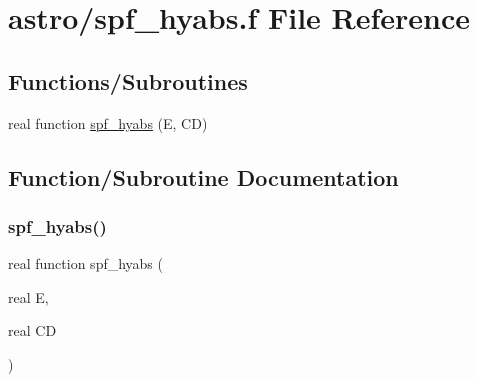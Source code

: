 \hypertarget{spf__hyabs_8f}{}\section{astro/spf\+\_\+hyabs.f File Reference}
\label{spf__hyabs_8f}
\subsection*{Functions/\+Subroutines}
\begin{DoxyCompactItemize}
\item 
real function \hyperlink{spf__hyabs_8f_a7057836dbbbb99e948e1d34a7072e89c}{spf\+\_\+hyabs} (E, CD)
\end{DoxyCompactItemize}


\subsection{Function/\+Subroutine Documentation}
\mbox{\label{spf__hyabs_8f_a7057836dbbbb99e948e1d34a7072e89c}} 
\subsubsection{\texorpdfstring{spf\+\_\+hyabs()}{spf\_hyabs()}}
{\footnotesize\ttfamily real function spf\+\_\+hyabs (\begin{DoxyParamCaption}\item[{real}]{E,  }\item[{real}]{CD }\end{DoxyParamCaption})}

